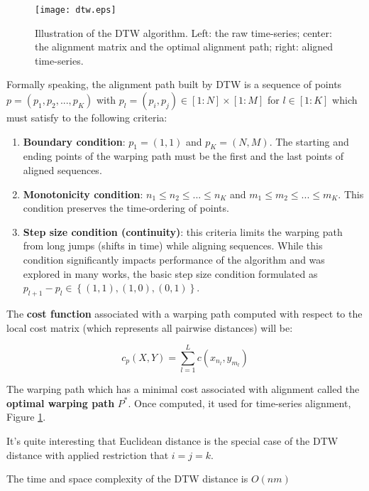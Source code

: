 \begin{figure}[tbp]
   \centering
   \texttt{[image: dtw.eps]}
   \caption{Illustration of the DTW algorithm. Left: the raw time-series; center: the alignment matrix and the optimal alignment path; right: aligned time-series.}
   \label{fig:dtw}
\end{figure} 

Formally speaking, the alignment path built by DTW is a sequence of points $p=(p_{1}, p_{2}, ... , p_{K})$ with $p_{l} = (p_{i}, p_{j}) \in [1:N] \times [1:M]$ for $l \in [1:K]$ which must satisfy to the following criteria:
\begin{enumerate}
	\item \textbf{Boundary condition}: $p_{1}=(1,1)$ and $p_{K}=(N,M)$. The starting and ending points of the warping path must be the first and the last points of aligned sequences.
	\item \textbf{Monotonicity condition}: $n_{1} \leq n_{2} \leq ... \leq n_{K}$ and $m_{1} \leq m_{2} \leq ... \leq m_{K}$. This condition preserves the time-ordering of points.
	\item \textbf{Step size condition (continuity)}: this criteria limits the warping path from long jumps (shifts in time) while aligning sequences. While this condition significantly impacts performance of the algorithm and was explored in many works, the basic step size condition formulated as $p_{l+1}-p_{l} \in \left\{ (1,1), (1,0), (0,1) \right\}$.
\end{enumerate}

The \textbf{cost function} associated with a warping path computed with respect to the local cost matrix (which represents all pairwise distances) will be: 

\begin{equation}
\label{eq:pathcost}
c_{p}(X,Y) = \sum_{l=1}^{L} c(x_{n_{l}}, y_{m_{l}})
\end{equation}

The warping path which has a minimal cost associated with alignment called the \textbf{optimal warping path} $P^{*}$. Once computed, it used for time-series alignment, Figure \ref{fig:dtw}.

It's quite interesting that Euclidean distance is the special case of the DTW distance with applied restriction that $i=j=k$.

The time and space complexity of the DTW distance is $O(nm)$
